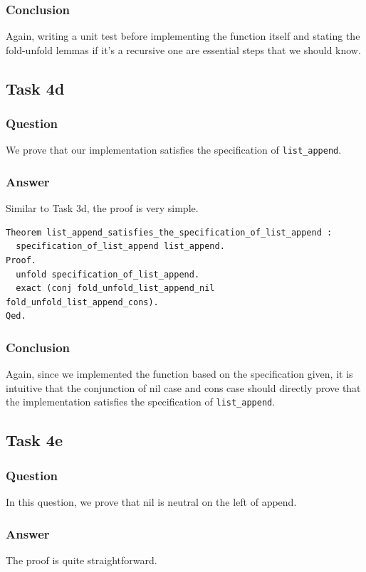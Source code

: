 \documentclass{article}
\begin{document}
\subsubsection{Conclusion}
Again, writing a unit test before implementing the function itself and stating the fold-unfold lemmas if it's a recursive one are essential steps that we should know.

\subsection{Task 4d}

\subsubsection{Question}
We prove that our implementation satisfies the specification of \texttt{list\_append}.

\subsubsection{Answer}
Similar to Task 3d, the proof is very simple.

\begin{lstlisting}
Theorem list_append_satisfies_the_specification_of_list_append :
  specification_of_list_append list_append.
Proof.
  unfold specification_of_list_append.
  exact (conj fold_unfold_list_append_nil fold_unfold_list_append_cons).
Qed.
\end{lstlisting}

\subsubsection{Conclusion}
Again, since we implemented the function based on the specification given, it is intuitive that the conjunction of nil case and cons case should directly prove that the implementation satisfies the specification of \texttt{list\_append}.

\subsection{Task 4e}

\subsubsection{Question}
In this question, we prove that nil is neutral on the left of append.

\subsubsection{Answer}
The proof is quite straightforward.
\end{document}
